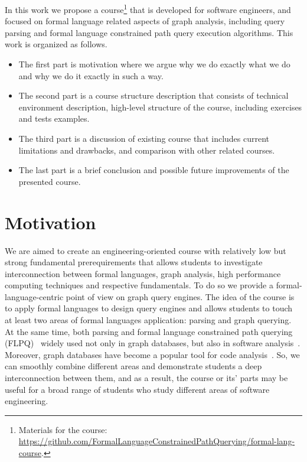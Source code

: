 \documentclass[sigconf]{acmart}
\begin{document}
In this work we propose a course\footnote{Materials for the course: \url{https://github.com/FormalLanguageConstrainedPathQuerying/formal-lang-course}.} that is developed for software engineers, and focused on formal language related aspects of graph analysis, including query parsing and formal language constrained path query execution algorithms.
This work is organized as follows.
\begin{itemize}
  \item The first part is motivation where we argue why we do exactly what we do and why we do it exactly in such a way. 
  \item The second part is a course structure description that consists of technical environment description, high-level structure of the course, including exercises and tests examples.
  \item The third part is a discussion of existing course that includes current limitations and drawbacks, and comparison with other related courses.
  \item The last part is a brief conclusion and possible future improvements of the presented course.
\end{itemize}  

\section{Motivation}

We are aimed to create an engineering-oriented course with relatively low but strong fundamental prerequirements that allows students to investigate interconnection between formal languages, graph analysis, high performance computing techniques and respective fundamentals.
To do so we provide a formal-language-centric point of view on graph query engines.
The idea of the course is to apply formal languages to design query engines and allows students to touch at least two areas of formal languages application: parsing and graph querying.
At the same time, both parsing and formal language constrained path querying (FLPQ)~\cite{10.1137/S0097539798337716} widely used not only in graph databases, but also in software analysis~\cite{10.1145/3583660.3583664}.
Moreover, graph databases have become a popular tool for code analysis~\cite{URMA2015127}.
So, we can smoothly combine different areas and demonstrate students a deep interconnection between them, and as a result, the course or its' parts may be useful for a broad range of students who study different areas of software engineering.
\end{document}
